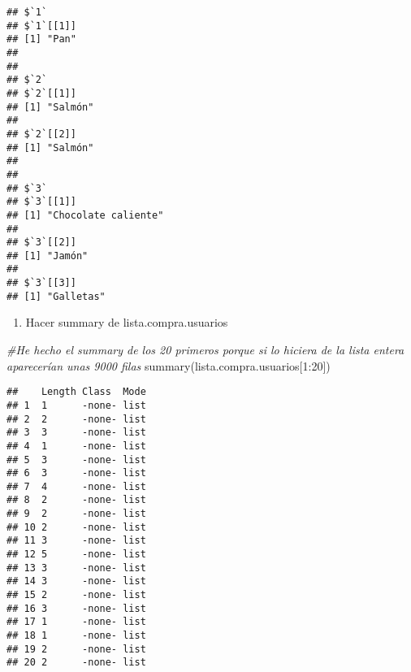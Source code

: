 \documentclass[
]{book}
\newenvironment{Shaded}{\begin{snugshade}}{\end{snugshade}}
\newcommand{\AttributeTok}[1]{\textcolor[rgb]{0.77,0.63,0.00}{#1}}
\newcommand{\CommentTok}[1]{\textcolor[rgb]{0.56,0.35,0.01}{\textit{#1}}}
\newcommand{\ControlFlowTok}[1]{\textcolor[rgb]{0.13,0.29,0.53}{\textbf{#1}}}
\newcommand{\DecValTok}[1]{\textcolor[rgb]{0.00,0.00,0.81}{#1}}
\newcommand{\FunctionTok}[1]{\textcolor[rgb]{0.00,0.00,0.00}{#1}}
\newcommand{\NormalTok}[1]{#1}
\newcommand{\OtherTok}[1]{\textcolor[rgb]{0.56,0.35,0.01}{#1}}
\newcommand{\SpecialCharTok}[1]{\textcolor[rgb]{0.00,0.00,0.00}{#1}}
\newcommand{\StringTok}[1]{\textcolor[rgb]{0.31,0.60,0.02}{#1}}
\providecommand{\tightlist}{%
  \setlength{\itemsep}{0pt}\setlength{\parskip}{0pt}}
\begin{document}
\begin{Shaded}
\end{Shaded}

\begin{verbatim}
## $`1`
## $`1`[[1]]
## [1] "Pan"
## 
## 
## $`2`
## $`2`[[1]]
## [1] "Salmón"
## 
## $`2`[[2]]
## [1] "Salmón"
## 
## 
## $`3`
## $`3`[[1]]
## [1] "Chocolate caliente"
## 
## $`3`[[2]]
## [1] "Jamón"
## 
## $`3`[[3]]
## [1] "Galletas"
\end{verbatim}

\begin{enumerate}
\def\labelenumi{\arabic{enumi}.}
\setcounter{enumi}{14}
\tightlist
\item
  Hacer summary de lista.compra.usuarios
\end{enumerate}

\begin{Shaded}
\begin{Highlighting}[]
\CommentTok{\#He hecho el summary de los 20 primeros porque si lo hiciera de la lista entera aparecerían unas 9000 filas}
\FunctionTok{summary}\NormalTok{(lista.compra.usuarios[}\DecValTok{1}\SpecialCharTok{:}\DecValTok{20}\NormalTok{])}
\end{Highlighting}
\end{Shaded}

\begin{verbatim}
##    Length Class  Mode
## 1  1      -none- list
## 2  2      -none- list
## 3  3      -none- list
## 4  1      -none- list
## 5  3      -none- list
## 6  3      -none- list
## 7  4      -none- list
## 8  2      -none- list
## 9  2      -none- list
## 10 2      -none- list
## 11 3      -none- list
## 12 5      -none- list
## 13 3      -none- list
## 14 3      -none- list
## 15 2      -none- list
## 16 3      -none- list
## 17 1      -none- list
## 18 1      -none- list
## 19 2      -none- list
## 20 2      -none- list
\end{verbatim}
\end{document}
